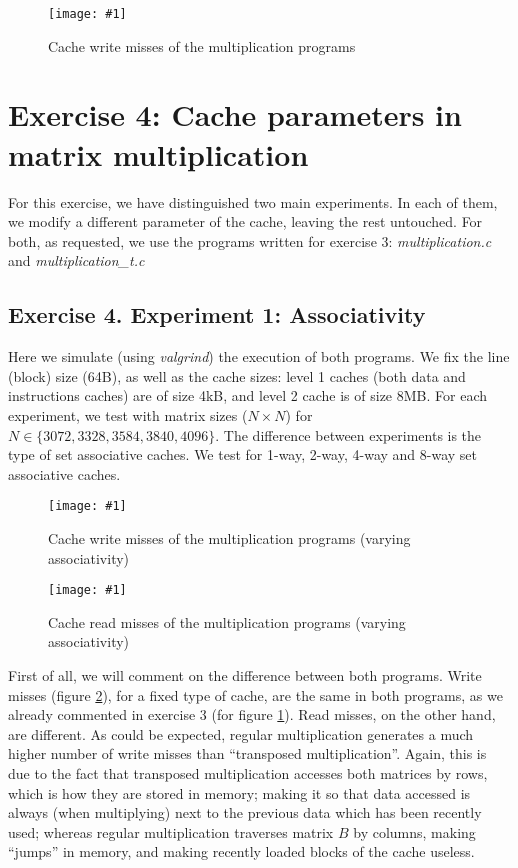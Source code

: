 \documentclass{article}
\newcommand{\myFigure}[4]{%
    \begin{figure}[!ht]
        \texttt{[image: \#1]}
        \centering
        \caption{#2}
        \label{#3}
    \end{figure}
}
\begin{document}
\myFigure{../material_P3/out3/mv_att2/mult_cache_write.png}{Cache write misses of the multiplication programs}{mult_misses_write}{0.5}


\section*{Exercise 4: Cache parameters in matrix multiplication}

For this exercise, we have distinguished two main experiments. In each of them, we modify a different parameter of the cache, leaving the rest untouched. For both, as requested, we use the programs written for exercise 3: \emph{multiplication.c} and \emph{multiplication\_t.c}


\subsection*{Exercise 4. Experiment 1: Associativity}

Here we simulate (using \emph{valgrind}) the execution of both programs. We fix the line (block) size (64B), as well as the cache sizes: level 1 caches (both data and instructions caches) are of size 4kB, and level 2 cache is of size 8MB. For each experiment, we test with matrix sizes ($N\times N$) for $N\in\{3072,3328,3584,3840,4096\}$. The difference between experiments is the type of set associative caches. We test for 1-way, 2-way, 4-way and 8-way set associative caches.

\myFigure{../material_P3/protect_out4/asoc/p2/4096/escritura.png}{Cache write misses of the multiplication programs (varying associativity)}{asoc_escritura}{0.517}

\myFigure{../material_P3/protect_out4/asoc/p2/4096/lectura.png}{Cache read misses of the multiplication programs (varying associativity)}{asoc_lectura}{0.517}

First of all, we will comment on the difference between both programs. Write misses (figure \ref{asoc_escritura}), for a fixed type of cache, are the same in both programs, as we already commented in exercise 3 (for figure \ref{mult_misses_write}). Read misses, on the other hand, are different. As could be expected, regular multiplication generates a much higher number of write misses than ``transposed multiplication''. Again, this is due to the fact that transposed multiplication accesses both matrices by rows, which is how they are stored in memory; making it so that data accessed is always (when multiplying) next to the previous data which has been recently used; whereas regular multiplication traverses matrix $B$ by columns, making ``jumps'' in memory, and making recently loaded blocks of the cache useless.
\end{document}

